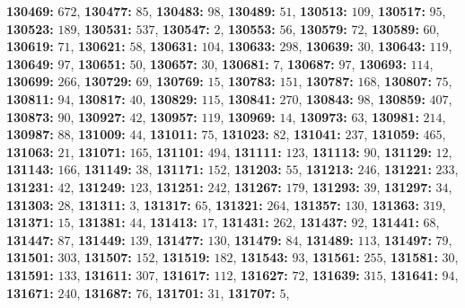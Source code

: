 \textsf{\bfseries 130469:} $672$, \textsf{\bfseries 130477:} $85$, \textsf{\bfseries 130483:} $98$, \textsf{\bfseries 130489:} $51$, \textsf{\bfseries 130513:} $109$, \textsf{\bfseries 130517:} $95$, \textsf{\bfseries 130523:} $189$, \textsf{\bfseries 130531:} $537$, \textsf{\bfseries 130547:} $2$, \textsf{\bfseries 130553:} $56$, \textsf{\bfseries 130579:} $72$, \textsf{\bfseries 130589:} $60$, \textsf{\bfseries 130619:} $71$, \textsf{\bfseries 130621:} $58$, \textsf{\bfseries 130631:} $104$, \textsf{\bfseries 130633:} $298$, \textsf{\bfseries 130639:} $30$, \textsf{\bfseries 130643:} $119$, \textsf{\bfseries 130649:} $97$, \textsf{\bfseries 130651:} $50$, \textsf{\bfseries 130657:} $30$, \textsf{\bfseries 130681:} $7$, \textsf{\bfseries 130687:} $97$, \textsf{\bfseries 130693:} $114$, \textsf{\bfseries 130699:} $266$, \textsf{\bfseries 130729:} $69$, \textsf{\bfseries 130769:} $15$, \textsf{\bfseries 130783:} $151$, \textsf{\bfseries 130787:} $168$, \textsf{\bfseries 130807:} $75$, \textsf{\bfseries 130811:} $94$, \textsf{\bfseries 130817:} $40$, \textsf{\bfseries 130829:} $115$, \textsf{\bfseries 130841:} $270$, \textsf{\bfseries 130843:} $98$, \textsf{\bfseries 130859:} $407$, \textsf{\bfseries 130873:} $90$, \textsf{\bfseries 130927:} $42$, \textsf{\bfseries 130957:} $119$, \textsf{\bfseries 130969:} $14$, \textsf{\bfseries 130973:} $63$, \textsf{\bfseries 130981:} $214$, \textsf{\bfseries 130987:} $88$, \textsf{\bfseries 131009:} $44$, \textsf{\bfseries 131011:} $75$, \textsf{\bfseries 131023:} $82$, \textsf{\bfseries 131041:} $237$, \textsf{\bfseries 131059:} $465$, \textsf{\bfseries 131063:} $21$, \textsf{\bfseries 131071:} $165$, \textsf{\bfseries 131101:} $494$, \textsf{\bfseries 131111:} $123$, \textsf{\bfseries 131113:} $90$, \textsf{\bfseries 131129:} $12$, \textsf{\bfseries 131143:} $166$, \textsf{\bfseries 131149:} $38$, \textsf{\bfseries 131171:} $152$, \textsf{\bfseries 131203:} $55$, \textsf{\bfseries 131213:} $246$, \textsf{\bfseries 131221:} $233$, \textsf{\bfseries 131231:} $42$, \textsf{\bfseries 131249:} $123$, \textsf{\bfseries 131251:} $242$, \textsf{\bfseries 131267:} $179$, \textsf{\bfseries 131293:} $39$, \textsf{\bfseries 131297:} $34$, \textsf{\bfseries 131303:} $28$, \textsf{\bfseries 131311:} $3$, \textsf{\bfseries 131317:} $65$, \textsf{\bfseries 131321:} $264$, \textsf{\bfseries 131357:} $130$, \textsf{\bfseries 131363:} $319$, \textsf{\bfseries 131371:} $15$, \textsf{\bfseries 131381:} $44$, \textsf{\bfseries 131413:} $17$, \textsf{\bfseries 131431:} $262$, \textsf{\bfseries 131437:} $92$, \textsf{\bfseries 131441:} $68$, \textsf{\bfseries 131447:} $87$, \textsf{\bfseries 131449:} $139$, \textsf{\bfseries 131477:} $130$, \textsf{\bfseries 131479:} $84$, \textsf{\bfseries 131489:} $113$, \textsf{\bfseries 131497:} $79$, \textsf{\bfseries 131501:} $303$, \textsf{\bfseries 131507:} $152$, \textsf{\bfseries 131519:} $182$, \textsf{\bfseries 131543:} $93$, \textsf{\bfseries 131561:} $255$, \textsf{\bfseries 131581:} $30$, \textsf{\bfseries 131591:} $133$, \textsf{\bfseries 131611:} $307$, \textsf{\bfseries 131617:} $112$, \textsf{\bfseries 131627:} $72$, \textsf{\bfseries 131639:} $315$, \textsf{\bfseries 131641:} $94$, \textsf{\bfseries 131671:} $240$, \textsf{\bfseries 131687:} $76$, \textsf{\bfseries 131701:} $31$, \textsf{\bfseries 131707:} $5$, 
